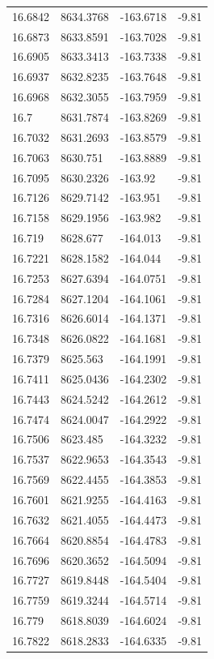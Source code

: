 \begin{table}[H]
\begin{tabular}{llll}
16.6842 & 8634.3768 & -163.6718 & -9.81 \\
16.6873 & 8633.8591 & -163.7028 & -9.81 \\
16.6905 & 8633.3413 & -163.7338 & -9.81 \\
16.6937 & 8632.8235 & -163.7648 & -9.81 \\
16.6968 & 8632.3055 & -163.7959 & -9.81 \\
16.7 & 8631.7874 & -163.8269 & -9.81 \\
16.7032 & 8631.2693 & -163.8579 & -9.81 \\
16.7063 & 8630.751 & -163.8889 & -9.81 \\
16.7095 & 8630.2326 & -163.92 & -9.81 \\
16.7126 & 8629.7142 & -163.951 & -9.81 \\
16.7158 & 8629.1956 & -163.982 & -9.81 \\
16.719 & 8628.677 & -164.013 & -9.81 \\
16.7221 & 8628.1582 & -164.044 & -9.81 \\
16.7253 & 8627.6394 & -164.0751 & -9.81 \\
16.7284 & 8627.1204 & -164.1061 & -9.81 \\
16.7316 & 8626.6014 & -164.1371 & -9.81 \\
16.7348 & 8626.0822 & -164.1681 & -9.81 \\
16.7379 & 8625.563 & -164.1991 & -9.81 \\
16.7411 & 8625.0436 & -164.2302 & -9.81 \\
16.7443 & 8624.5242 & -164.2612 & -9.81 \\
16.7474 & 8624.0047 & -164.2922 & -9.81 \\
16.7506 & 8623.485 & -164.3232 & -9.81 \\
16.7537 & 8622.9653 & -164.3543 & -9.81 \\
16.7569 & 8622.4455 & -164.3853 & -9.81 \\
16.7601 & 8621.9255 & -164.4163 & -9.81 \\
16.7632 & 8621.4055 & -164.4473 & -9.81 \\
16.7664 & 8620.8854 & -164.4783 & -9.81 \\
16.7696 & 8620.3652 & -164.5094 & -9.81 \\
16.7727 & 8619.8448 & -164.5404 & -9.81 \\
16.7759 & 8619.3244 & -164.5714 & -9.81 \\
16.779 & 8618.8039 & -164.6024 & -9.81 \\
16.7822 & 8618.2833 & -164.6335 & -9.81 \\

\end{tabular}
\end{table}

